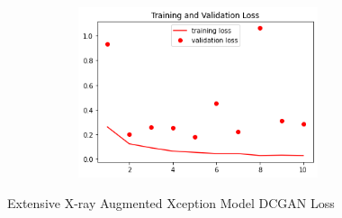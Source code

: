  \begin{figure}[H]
    \centering
    \includegraphics[width=1\textwidth,height=5cm,keepaspectratio]{Images/XceptionBaselineTrainingValidationLossExtensiveXray.png}\\
    \caption{Extensive X-ray Augmented Xception Model DCGAN Loss}
    \label{fig:Extensive X-ray Augmented Xception Model DCGAN Loss}
\end{figure}
